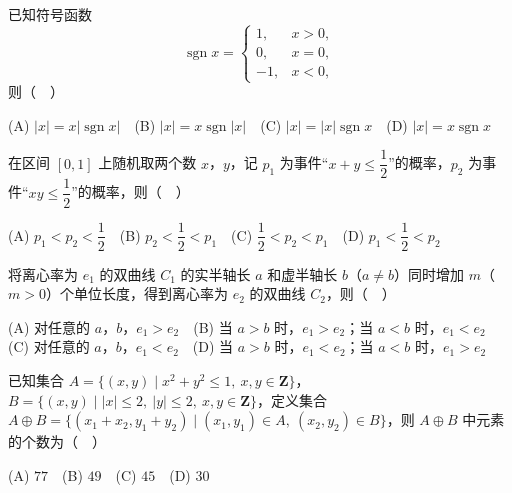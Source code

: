 \begin{question}
已知符号函数
\nopagebreak[4]
\[
\operatorname{sgn}x=\begin{cases}
1, & x>0,\\
0, & x=0,\\
-1, & x<0,
\end{cases}
\]
则（　）

(A) \(|x|=x|\operatorname{sgn}x|\)　(B) \(|x|=x\operatorname{sgn}|x|\)　(C) \(|x|=|x|\operatorname{sgn}x\)　(D) \(|x|=x\operatorname{sgn}x\)

\end{question}
\begin{question}
在区间 \([0,1]\) 上随机取两个数 \(x\)，\(y\)，记 \(p_1\) 为事件“\(x+y\leqslant\dfrac12\)”的概率，\(p_2\) 为事件“\(xy\leqslant\dfrac12\)”的概率，则（　）

(A) \(p_1<p_2<\dfrac12\)　(B) \(p_2<\dfrac12<p_1\)　(C) \(\dfrac12<p_2<p_1\)　(D) \(p_1<\dfrac12<p_2\)

\end{question}
\begin{question}
将离心率为 \(e_1\) 的双曲线 \(C_1\) 的实半轴长 \(a\) 和虚半轴长 \(b\)（\(a\neq b\)）同时增加 \(m\)（\(m>0\)）个单位长度，得到离心率为 \(e_2\) 的双曲线 \(C_2\)，则（　）

(A) 对任意的 \(a\)，\(b\)，\(e_1>e_2\)　(B) 当 \(a>b\) 时，\(e_1>e_2\)；当 \(a<b\) 时，\(e_1<e_2\)　(C) 对任意的 \(a\)，\(b\)，\(e_1<e_2\)　(D) 当 \(a>b\) 时，\(e_1<e_2\)；当 \(a<b\) 时，\(e_1>e_2\)

\end{question}
\begin{question}
已知集合 \(A=\{(x,y)\mid x^2+y^2\leqslant1,\ x,y\in\mathbf{Z}\}\)，\(B=\{(x,y)\mid |x|\leqslant2,\ |y|\leqslant2,\ x,y\in\mathbf{Z}\}\)，定义集合 \(A\oplus B=\{(x_1+x_2,y_1+y_2)\mid (x_1,y_1)\in A,\ (x_2,y_2)\in B\}\)，则 \(A\oplus B\) 中元素的个数为（　）

(A) \(77\)　(B) \(49\)　(C) \(45\)　(D) \(30\)

\end{question}

